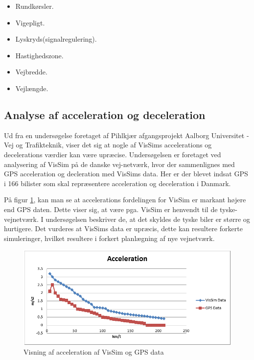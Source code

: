 \begin{itemize}
\item Rundkørsler.
\item Vigepligt.
\item Lyskryds(signalregulering).
\item Hastighedszone.
\item Vejbredde.
\item Vejlængde.
\end{itemize}

\subsection{Analyse af acceleration og deceleration}
Ud fra en undersøgelse foretaget af Pihlkjær afgangsprojekt Aalborg Universitet - Vej og Trafikteknik, viser det sig at nogle af VisSims accelerations og decelerations værdier kan være upræcise. Undersøgelsen er foretaget ved analysering af VisSim på de danske vej-netværk, hvor der sammenlignes med GPS acceleration og decleration med VisSims data. Her er der blevet indsat GPS i 166 bilister som skal repræsentere acceleration og deceleration i Danmark.

På figur \ref{GrafForAccelerationVisSimGPS}, kan man se at accelerations fordelingen for VisSim er markant højere end GPS daten. Dette viser sig, at være pga. VisSim er henvendt til de tyske-vejnetværk. I undersøgelsen beskriver de, at det skyldes de tyske biler er større og hurtigere. Det vurderes at VisSims data er upræcis, dette kan resultere forkerte simuleringer, hvilket resultere i forkert planlægning af nye vejnetværk. 


\begin{figure}
\begin{center}
\includegraphics[width=1.0\textwidth]{Pictures/Teknologianalyse/GrafForAccelerationVisSimGPS.png}
\end{center}
\caption{Visning af acceleration af VisSim og GPS data}
\label{GrafForAccelerationVisSimGPS}
\end{figure}

